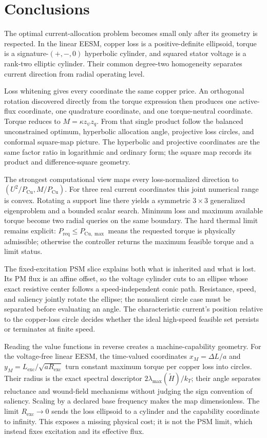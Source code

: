 \section{Conclusions}
\label{sec:conclusion}

The optimal current-allocation problem becomes small only after its geometry
is respected. In the linear EESM, copper loss is a positive-definite
ellipsoid, torque is a signature-\((+,-,0)\) hyperbolic cylinder, and squared
stator voltage is a rank-two elliptic cylinder. Their common degree-two
homogeneity separates current direction from radial operating level.

Loss whitening gives every coordinate the same copper price. An orthogonal
rotation discovered directly from the torque expression then produces one
active-flux coordinate, one quadrature coordinate, and one torque-neutral
coordinate. Torque reduces to \(M=\kappa z_\psi z_q\). From that single
product follow the balanced unconstrained optimum, hyperbolic allocation
angle, projective loss circles, and conformal square-map picture. The
hyperbolic and projective coordinates are the same factor ratio in logarithmic
and ordinary form; the square map records its product and difference-square
geometry.

The strongest computational view maps every loss-normalized direction to
\((U^2/P_{\mathrm{Cu}},M/P_{\mathrm{Cu}})\). For three real current
coordinates this joint numerical range is convex. Rotating a support line
there yields a symmetric \(3\times3\) generalized eigenproblem and a bounded
scalar search. Minimum loss and maximum available torque become two radial
queries on the same boundary. The hard thermal limit remains explicit:
\(P_{\mathrm{req}}\leq P_{\mathrm{Cu},\max}\) means the requested torque is
physically admissible; otherwise the controller returns the maximum feasible
torque and a limit status.

The fixed-excitation PSM slice explains both what is inherited and what is
lost. Its PM flux is an affine offset, so the voltage cylinder cuts to an
ellipse whose exact resistive center follows a speed-independent conic path.
Resistance, speed, and saliency jointly rotate the ellipse; the nonsalient
circle case must be separated before evaluating an angle. The characteristic
current's position relative to the copper-loss circle decides whether the
ideal high-speed feasible set persists or terminates at finite speed.

Reading the value functions in reverse creates a machine-capability geometry.
For the voltage-free linear EESM, the time-valued coordinates
\(x_M=\Delta L/a\) and
\(y_M=L_{\mathrm{exc}}/\sqrt{aR_{\mathrm{exc}}}\) turn constant maximum
torque per copper loss into circles. Their radius is the exact spectral
descriptor \(2\lambda_{\max}(\widetilde H)/k_T\); their angle separates
reluctance and wound-field mechanisms without judging the sign convention of
saliency. Scaling by a declared base frequency makes the map dimensionless.
The limit \(R_{\mathrm{exc}}\to0\) sends the loss ellipsoid to a cylinder and
the capability coordinate to infinity. This exposes a missing physical cost;
it is not the PSM limit, which instead fixes excitation and its effective flux.


